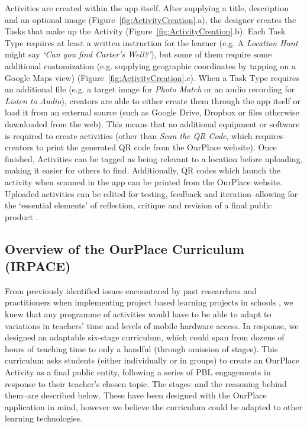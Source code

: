 \documentclass[,hyphens]{sigchi}
\begin{document}
Activities are created within the app itself. After supplying a title, description and an optional image (Figure~\ref{fig:ActivityCreation}.a), the designer creates the Tasks that make up the Activity (Figure~\ref{fig:ActivityCreation}.b). Each Task Type requires at least a written instruction for the learner (e.g. A \textit{Location Hunt} might say \textit{`Can you find Carter's Well?'}), but some of them require some additional customization (e.g. supplying geographic coordinates by tapping on a Google Maps view) (Figure~\ref{fig:ActivityCreation}.c). When a Task Type requires an additional file (e.g. a target image for \textit{Photo Match} or an audio recording for \textit{Listen to Audio}), creators are able to either create them through the app itself or load it from an external source (such as Google Drive, Dropbox or files otherwise downloaded from the web). This means that no additional equipment or software is required to create activities (other than \textit{Scan the QR Code}, which requires creators to print the generated QR code from the OurPlace website). Once finished, Activities can be tagged as being relevant to a location before uploading, making it easier for others to find. Additionally, QR codes which launch the activity when scanned in the app can be printed from the OurPlace website. Uploaded activities can be edited for testing, feedback and iteration--allowing for the `essential elements' of reflection, critique and revision of a final public product \cite{Larmer2015}. 


\subsection{Overview of the OurPlace Curriculum (IRPACE)}

From previously identified issues encountered by past researchers and practitioners when implementing project based learning projects in schools \cite{Blumenfeld1991, Krajcik2006, InnovationUnit2016, TheEducationEndowmentFoundation2016}, we knew that any programme of activities would have to be able to adapt to variations in teachers' time and levels of mobile hardware access. In response, we designed an adaptable six-stage curriculum, which could span from dozens of hours of teaching time to only a handful (through omission of stages). This curriculum asks students (either individually or in groups) to create an OurPlace Activity as a final public entity, following a series of PBL engagements in response to their teacher's chosen topic. The stages--and the reasoning behind them--are described below. These have been designed with the OurPlace application in mind, however we believe the curriculum could be adapted to other learning technologies.
\end{document}
